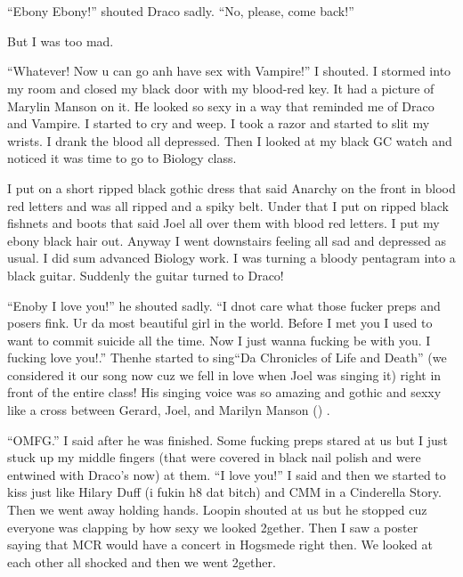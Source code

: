 \section{}



\enquote{Ebony Ebony!} shouted Draco sadly. \enquote{No, please, come back!}

But I was too mad.

\begin{sloppypar}
    \enquote{Whatever! Now u can go anh have sex with Vampire!} I shouted. I stormed into my room and closed my black door with my blood-red key. It had a picture of Marylin Manson on it. He looked so sexy in a way that reminded me of Draco and Vampire. I started to cry and weep. I took a razor and started to slit my wrists. I drank the blood all depressed. Then I looked at my black GC watch and noticed it was time to go to Biology class.    
\end{sloppypar}

I put on a short ripped black gothic dress that said Anarchy on the front in blood red letters and was all ripped and a spiky belt. Under that I put on ripped black fishnets and boots that said Joel all over them with blood red letters. I put my ebony black hair out. Anyway I went downstairs feeling all sad and depressed as usual. I did sum advanced Biology work. I was turning a bloody pentagram into a black guitar. Suddenly the guitar turned to Draco!

\enquote{Enoby I love you!} he shouted sadly. \enquote{I dnot care what those fucker preps and posers fink. Ur da most beautiful girl in the world. Before I met you I used to want to commit suicide all the time. Now I just wanna fucking be with you. I fucking love you!.} Then\dotfill he started to sing\newline \enquote{Da Chronicles of Life and Death} (we considered it our song now cuz we fell in love when Joel was singing it) right in front of the entire class! His singing voice was so amazing and gothic and sexxy like a cross between Gerard, Joel,   and Marilyn Manson () .

\enquote{OMFG.} I said after he was finished. Some fucking preps stared at us but I just stuck up my middle fingers (that were covered in black nail polish and were entwined with Draco's now) at them. \enquote{I love you!} I said and then we started to kiss just like Hilary Duff (i fukin h8 dat bitch) and CMM in a Cinderella Story. Then we went away holding hands. Loopin shouted at us but he stopped cuz everyone was clapping by how sexy we looked 2gether. Then I saw a poster saying that MCR would have a concert in Hogsmede right then. We looked at each other all shocked and then we went 2gether.
